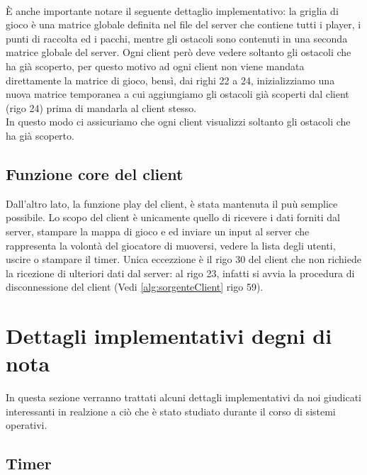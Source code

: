 \documentclass[a4paper]{article}
\begin{document}
\paragraph{}
È anche importante notare il seguente dettaglio implementativo: la griglia di gioco
è una matrice globale definita nel file del server che contiene tutti i player,
i punti di raccolta ed i pacchi,  mentre gli ostacoli sono contenuti in una seconda matrice globale del server. 
Ogni client però deve vedere soltanto gli ostacoli che ha già scoperto, 
per questo motivo ad ogni client non viene mandata direttamente la matrice di gioco, bensì, dai righi 22 a 24, 
inizializziamo una nuova matrice temporanea 
a cui aggiungiamo gli ostacoli già scoperti dal client (rigo 24) prima di mandarla al client stesso.
\\In questo modo ci assicuriamo che ogni client visualizzi soltanto gli ostacoli che ha già scoperto.




\subsection{Funzione core del client}
Dall'altro lato, la funzione play del client, è stata mantenuta il puù semplice possibile.
Lo scopo del client è unicamente quello di ricevere i dati forniti dal server, stampare la mappa di gioco e ed inviare un input al server che rappresenta la volontà del giocatore di muoversi, vedere la lista degli utenti, uscire o stampare il timer.
Unica eccezzione è il rigo 30  del client che non richiede la ricezione di ulteriori dati dal server: al rigo 23, infatti si avvia la procedura di disconnessione del client (Vedi \autoref{alg:sorgenteClient} rigo 59).


\pagebreak
\section{Dettagli implementativi degni di nota}
In questa sezione verranno trattati alcuni dettagli implementativi da noi giudicati interessanti in realzione a ciò che è stato studiato durante il corso di sistemi operativi.
\subsection{Timer}
\end{document}

